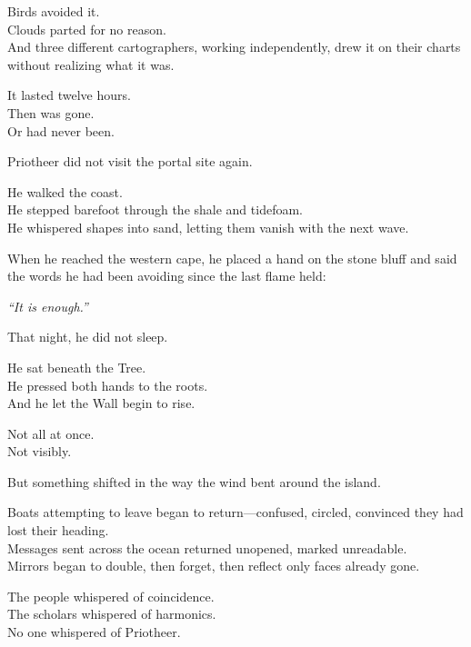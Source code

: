 \documentclass[12pt]{article}
\begin{document}
\vspace{0.5em}
Birds avoided it.\\
Clouds parted for no reason.\\
And three different cartographers, working independently, drew it on their charts without realizing what it was.

\vspace{0.5em}
It lasted twelve hours.\\
Then was gone.\\
Or had never been.

\vspace{0.5em}
Priotheer did not visit the portal site again.

\vspace{0.5em}
He walked the coast.\\
He stepped barefoot through the shale and tidefoam.\\
He whispered shapes into sand, letting them vanish with the next wave.

\vspace{0.5em}
When he reached the western cape, he placed a hand on the stone bluff and said the words he had been avoiding since the last flame held:

\vspace{0.5em}
\textit{``It is enough.''}

\vspace{0.5em}
That night, he did not sleep.

\vspace{0.5em}
He sat beneath the Tree.\\
He pressed both hands to the roots.\\
And he let the Wall begin to rise.

\vspace{0.5em}
Not all at once.\\
Not visibly.

\vspace{0.5em}
But something shifted in the way the wind bent around the island.

\vspace{0.5em}
Boats attempting to leave began to return---confused, circled, convinced they had lost their heading.\\
Messages sent across the ocean returned unopened, marked unreadable.\\
Mirrors began to double, then forget, then reflect only faces already gone.

\vspace{0.5em}
The people whispered of coincidence.\\
The scholars whispered of harmonics.\\
No one whispered of Priotheer.
\end{document}
